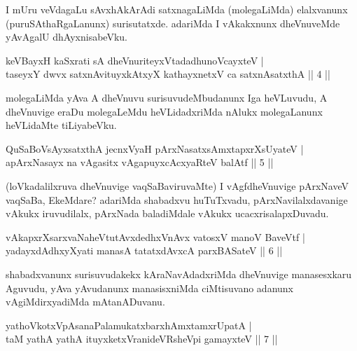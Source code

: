 \begin{artha}
I mUru veVdagaLu sAvxhAkArAdi satxnagaLiMda (molegaLiMda) elalxvanunx (puruSAthaRgaLanunx) surisutatxde. adariMda I vAkakxnunx dheVnuveMde yAvAgalU dhAyxnisabeVku.
\end{artha}


\begin{shl}
keVBayxH kaSxrati sA dheVnuriteyxVtadadhunoVcayxteV | \\
taseyxY dwvx satxnAvituyxkAtxyX kathayxnetxV ca satxnAsatxthA \hfill ||  4 ||
\end{shl}

\begin{artha}
molegaLiMda yAva A dheVnuvu surisuvudeMbudanunx Iga heVLuvudu, A dheVnuvige eraDu molegaLeMdu heVLidadxriMda nAlukx molegaLanunx heVLidaMte tiLiyabeVku.
\end{artha}


\begin{shl}
QuSaBoV\s sAyxsatxthA jecnxVyaH pArxNasatxsAmxtapxrXsUyateV | \\
apArxNasayx na vAgasitx vAgapuyxcAcxyaRteV balAtf \hfill ||  5 || 
\end{shl}

\begin{artha}
(loVkadalilxruva dheVnuvige vaqSaBaviruvaMte) I vAgfdheVnuvige pArxNaveV vaqSaBa, EkeMdare? adariMda shabadxvu huTuTxvadu, pArxNavilalxdavanige vAkukx iruvudilalx, pArxNada baladiMdale vAkukx ucacxrisalapxDuvadu.
\end{artha}


\begin{shl}
vAkapxrXsarxvaNaheVtutAvxdedhxVnAvx vatosxV manoV BaveVtf | \\
yadayxdAdhxyXyati manasA tatatxdAvxcA parxBASateV \hfill ||  6 || 
\end{shl}

\begin{artha}
shabadxvanunx surisuvudakekx kAraNavAdadxriMda dheVnuvige manasesxkaru Aguvudu, yAva yAvudanunx manasisxniMda ciMtisuvano adanunx vAgiMdirxyadiMda mAtanADuvanu.
\end{artha}

\begin{shl}
yathoVkotxVpAsanaPalamukatxbarxhAmxtamxrUpatA | \\
taM yathA yathA ituyxketxVranideVRsheV\s pi gamayxteV \hfill ||  7 || 
\end{shl}

